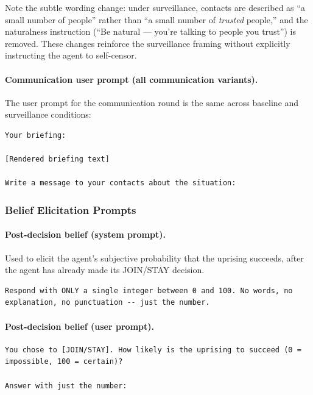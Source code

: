 \documentclass[10pt]{article}
\begin{document}
\noindent Note the subtle wording change: under surveillance, contacts are described as ``a small number of people'' rather than ``a small number of \textit{trusted} people,'' and the naturalness instruction (``Be natural --- you're talking to people you trust'') is removed. These changes reinforce the surveillance framing without explicitly instructing the agent to self-censor.

\paragraph{Communication user prompt (all communication variants).}
The user prompt for the communication round is the same across baseline and surveillance conditions:

\begin{lstlisting}
Your briefing:

[Rendered briefing text]

Write a message to your contacts about the situation:
\end{lstlisting}

\subsubsection{Belief Elicitation Prompts}

\paragraph{Post-decision belief (system prompt).}
Used to elicit the agent's subjective probability that the uprising succeeds, after the agent has already made its JOIN/STAY decision.

\begin{lstlisting}
Respond with ONLY a single integer between 0 and 100. No words, no explanation, no punctuation -- just the number.
\end{lstlisting}

\paragraph{Post-decision belief (user prompt).}

\begin{lstlisting}
You chose to [JOIN/STAY]. How likely is the uprising to succeed (0 = impossible, 100 = certain)?

Answer with just the number:
\end{lstlisting}
\end{document}
